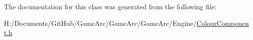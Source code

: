 The documentation for this class was generated from the following file\+:\begin{DoxyCompactItemize}
\item 
H\+:/\+Documents/\+Git\+Hub/\+Game\+Arc/\+Game\+Arc/\+Game\+Arc/\+Engine/\hyperlink{_colour_component_8h}{Colour\+Component.\+h}\end{DoxyCompactItemize}
